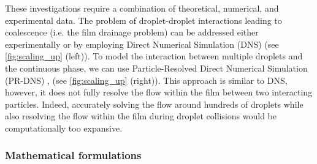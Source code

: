 These investigations require a combination of theoretical, numerical, and experimental data. %
The problem of droplet-droplet interactions leading to coalescence (i.e. the film drainage problem) can be addressed either experimentally or by employing Direct Numerical Simulation (DNS)  (see \ref{fig:scaling_up} (left)).
To model the interaction between multiple droplets and the continuous phase, we can use Particle-Resolved Direct Numerical Simulation (PR-DNS) \citep{tryggvason2006direct}, (see \ref{fig:scaling_up} (right)).
This approach is similar to DNS, however, it does not fully resolve the flow within the film between two interacting particles.
Indeed, accurately solving the flow around hundreds of droplets while also resolving the flow within the film during droplet collisions would be computationally too expansive.




\subsubsection{Mathematical formulations}

